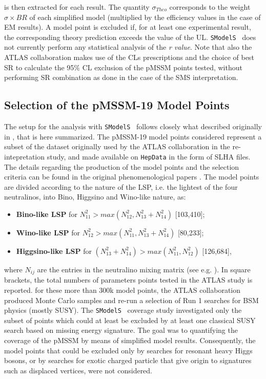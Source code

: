 \documentclass[a4paper,11pt]{article}
\newcommand{\SMO}{\texttt{SModelS\xspace}}
\newcommand{\RVALUE}{\textit{r value}}
\begin{document}
is then extracted for each result. 
The quantity $\sigma_{Theo}$ corresponds to the weight $\sigma \times BR$ of each simplified model (multiplied by the efficiency values in the case of EM results). A model point is excluded if, for at least one experimental result, the corresponding theory prediction exceeds the value of the UL. \SMO~ does not currently perform any statistical analysis of the \RVALUE. Note that also the ATLAS collaboration makes use of the CLs prescriptions and the choice of best SR to calculate the 95$\%$ CL exclusion of the pMSSM points tested, without performing SR combination as done in the case of the SMS interpretation. 


%
\subsection{Selection of the pMSSM-19 Model Points}
The setup for the analysis with \SMO~ follows closely what described originally in \cite{Ambrogi:2017lov}, that is here summarized. The pMSSM-19 model points considered represent a subset of the dataset originally used by the ATLAS collaboration in the re-intepretation study\cite{Aad:2015baa}, and made available on \texttt{HepData}\cite{ATLASpMSSMhepdata} in the form of SLHA\cite{Skands:2003cj} files. The details regarding the production of the model points and the selection criteria can be found in the original phenomenological papers \cite{Berger:2008cq,CahillRowley:2012cb,CahillRowley:2012kx,Cahill-Rowley:2014twa}.
The model points are divided according to the nature of the LSP, i.e. the lightest of the four neutralinos, into Bino, Higgsino and Wino-like nature, as:
\begin{itemize}
	\item \textbf{Bino-like LSP} for $N_{11}^2 > max(N^2_{12},N^2_{13} + N^2_{14})$ [103,410]; \
	\item \textbf{Wino-like LSP} for $N_{12}^2 > max(N^2_{11},N^2_{13} + N^2_{14})$ [80,233]; \
	\item \textbf{Higgsino-like LSP} for $(N_{13}^2 + N_{14}^2 )  > max(N^2_{11},N^2_{12})$ [126,684],\
\end{itemize}
where $N_{ij}$ are the entries in the neutralino mixing matrix (see e.g. \cite{Martin:1997ns}). In square brackets, the total numbers of parameters points tested in the ATLAS study is reported. for these more than 300k model points, the ATLAS collaboration produced Monte Carlo samples and re-run a selection of Run 1 searches for BSM physics (mostly SUSY). The \SMO~ coverage study investigated only the subset of points which could at least be excluded by at least one classical SUSY search based on missing energy signature. The goal was to quantifying the coverage of the pMSSM by means of simplified model results. Consequently, the model points that could be excluded only by searches for resonant heavy Higgs bosons, or by searches for exotic charged particle that give origin to signatures such as displaced vertices, were not considered.
\end{document}
